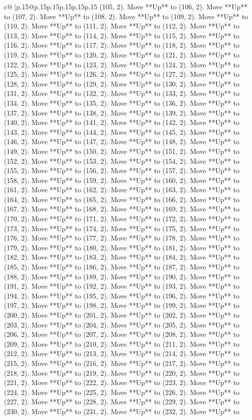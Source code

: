 \documentclass{article}
\begin{document}
{\begin{supertabular}{c@{$\;$}|p{.15\linewidth}@{}p{.15\linewidth}p{.15\linewidth}p{.15\linewidth}p{.15\linewidth}p{.15\linewidth}}
{{{(105, 2). Move **Up** to (106, 2). Move **Up** to (107, 2). Move **Up** to (108, 2). Move **Up** to (109, 2). Move **Up** to (110, 2). Move **Up** to (111, 2). Move **Up** to (112, 2). Move **Up** to (113, 2). Move **Up** to (114, 2). Move **Up** to (115, 2). Move **Up** to (116, 2). Move **Up** to (117, 2). Move **Up** to (118, 2). Move **Up** to (119, 2). Move **Up** to (120, 2). Move **Up** to (121, 2). Move **Up** to (122, 2). Move **Up** to (123, 2). Move **Up** to (124, 2). Move **Up** to (125, 2). Move **Up** to (126, 2). Move **Up** to (127, 2). Move **Up** to (128, 2). Move **Up** to (129, 2). Move **Up** to (130, 2). Move **Up** to (131, 2). Move **Up** to (132, 2). Move **Up** to (133, 2). Move **Up** to (134, 2). Move **Up** to (135, 2). Move **Up** to (136, 2). Move **Up** to (137, 2). Move **Up** to (138, 2). Move **Up** to (139, 2). Move **Up** to (140, 2). Move **Up** to (141, 2). Move **Up** to (142, 2). Move **Up** to (143, 2). Move **Up** to (144, 2). Move **Up** to (145, 2). Move **Up** to (146, 2). Move **Up** to (147, 2). Move **Up** to (148, 2). Move **Up** to (149, 2). Move **Up** to (150, 2). Move **Up** to (151, 2). Move **Up** to (152, 2). Move **Up** to (153, 2). Move **Up** to (154, 2). Move **Up** to (155, 2). Move **Up** to (156, 2). Move **Up** to (157, 2). Move **Up** to (158, 2). Move **Up** to (159, 2). Move **Up** to (160, 2). Move **Up** to (161, 2). Move **Up** to (162, 2). Move **Up** to (163, 2). Move **Up** to (164, 2). Move **Up** to (165, 2). Move **Up** to (166, 2). Move **Up** to (167, 2). Move **Up** to (168, 2). Move **Up** to (169, 2). Move **Up** to (170, 2). Move **Up** to (171, 2). Move **Up** to (172, 2). Move **Up** to (173, 2). Move **Up** to (174, 2). Move **Up** to (175, 2). Move **Up** to (176, 2). Move **Up** to (177, 2). Move **Up** to (178, 2). Move **Up** to (179, 2). Move **Up** to (180, 2). Move **Up** to (181, 2). Move **Up** to (182, 2). Move **Up** to (183, 2). Move **Up** to (184, 2). Move **Up** to (185, 2). Move **Up** to (186, 2). Move **Up** to (187, 2). Move **Up** to (188, 2). Move **Up** to (189, 2). Move **Up** to (190, 2). Move **Up** to (191, 2). Move **Up** to (192, 2). Move **Up** to (193, 2). Move **Up** to (194, 2). Move **Up** to (195, 2). Move **Up** to (196, 2). Move **Up** to (197, 2). Move **Up** to (198, 2). Move **Up** to (199, 2). Move **Up** to (200, 2). Move **Up** to (201, 2). Move **Up** to (202, 2). Move **Up** to (203, 2). Move **Up** to (204, 2). Move **Up** to (205, 2). Move **Up** to (206, 2). Move **Up** to (207, 2). Move **Up** to (208, 2). Move **Up** to (209, 2). Move **Up** to (210, 2). Move **Up** to (211, 2). Move **Up** to (212, 2). Move **Up** to (213, 2). Move **Up** to (214, 2). Move **Up** to (215, 2). Move **Up** to (216, 2). Move **Up** to (217, 2). Move **Up** to (218, 2). Move **Up** to (219, 2). Move **Up** to (220, 2). Move **Up** to (221, 2). Move **Up** to (222, 2). Move **Up** to (223, 2). Move **Up** to (224, 2). Move **Up** to (225, 2). Move **Up** to (226, 2). Move **Up** to (227, 2). Move **Up** to (228, 2). Move **Up** to (229, 2). Move **Up** to (230, 2). Move **Up** to (231, 2). Move **Up** to (232, 2). Move **Up** to }}}
\end{supertabular}}
\end{document}
